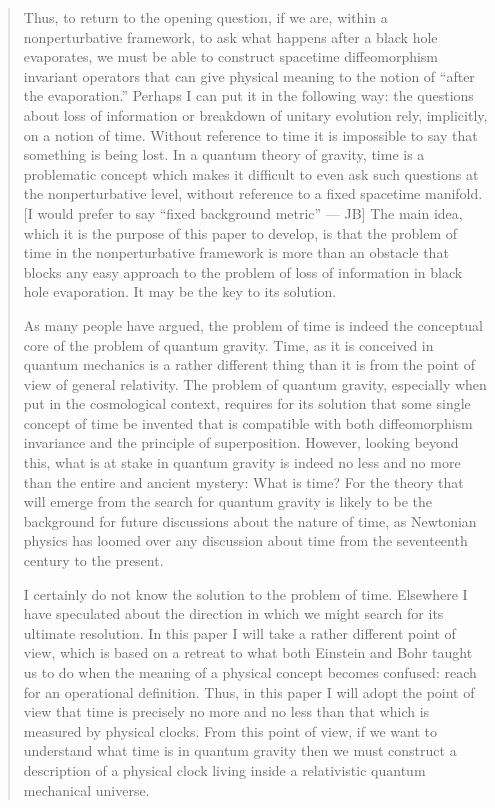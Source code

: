 \documentclass{article}
\begin{document}
\begin{quote}

Thus, to return to the opening question, if we are, within a
nonperturbative framework, to ask what happens after a black hole
evaporates, we must be able to construct spacetime diffeomorphism
invariant operators that can give physical meaning to the notion of
``after the evaporation.'' Perhaps I can put it in the following way:
the questions about loss of information or breakdown of unitary
evolution rely, implicitly, on a notion of time. Without reference to
time it is impossible to say that something is being lost. In a quantum
theory of gravity, time is a problematic concept which makes it
difficult to even ask such questions at the nonperturbative level,
without reference to a fixed spacetime manifold. {[}I would prefer to
say ``fixed background metric'' --- JB{]} The main idea, which it is the
purpose of this paper to develop, is that the problem of time in the
nonperturbative framework is more than an obstacle that blocks any easy
approach to the problem of loss of information in black hole
evaporation. It may be the key to its solution.

As many people have argued, the problem of time is indeed the conceptual
core of the problem of quantum gravity. Time, as it is conceived in
quantum mechanics is a rather different thing than it is from the point
of view of general relativity. The problem of quantum gravity,
especially when put in the cosmological context, requires for its
solution that some single concept of time be invented that is compatible
with both diffeomorphism invariance and the principle of superposition.
However, looking beyond this, what is at stake in quantum gravity is
indeed no less and no more than the entire and ancient mystery: What is
time? For the theory that will emerge from the search for quantum
gravity is likely to be the background for future discussions about the
nature of time, as Newtonian physics has loomed over any discussion
about time from the seventeenth century to the present.

I certainly do not know the solution to the problem of time. Elsewhere I
have speculated about the direction in which we might search for its
ultimate resolution. In this paper I will take a rather different point
of view, which is based on a retreat to what both Einstein and Bohr
taught us to do when the meaning of a physical concept becomes confused:
reach for an operational definition. Thus, in this paper I will adopt
the point of view that time is precisely no more and no less than that
which is measured by physical clocks. From this point of view, if we
want to understand what time is in quantum gravity then we must
construct a description of a physical clock living inside a relativistic
quantum mechanical universe.

\end{quote}
\end{document}
